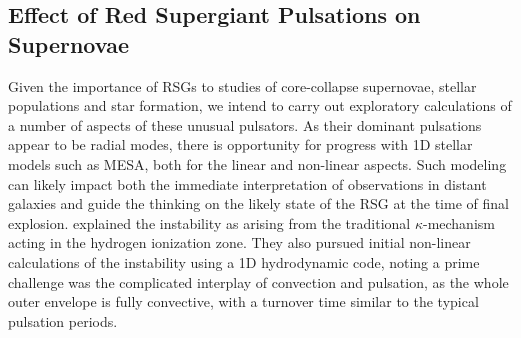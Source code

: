 \subsection{Effect of Red Supergiant Pulsations on Supernovae}

Given the importance of RSGs to studies of core-collapse supernovae, stellar populations and star formation, we intend to carry out exploratory calculations of a number of aspects of these unusual pulsators. As their dominant pulsations appear to be radial modes, there is opportunity for progress with 1D stellar models such as MESA, both for the linear and non-linear aspects. {\color{green} Such modeling can likely impact both the immediate interpretation of observations in distant galaxies and guide the thinking on the likely state of the RSG at the time of final explosion.} \citet{1997AampA...327..224H}  explained the instability  as arising from the traditional $\kappa$-mechanism acting in the hydrogen ionization zone. They also pursued initial
non-linear calculations of the instability using a 1D hydrodynamic code, noting a prime challenge was the complicated interplay of convection and pulsation, as the whole outer envelope is fully convective, with a turnover time similar to the typical pulsation periods.